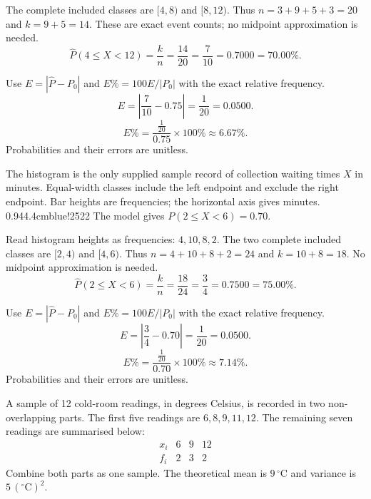 
The complete included classes are $[4,8)$ and $[8,12)$.
Thus $n=3+9+5+3=20$ and $k=9+5=14$. These are exact event counts; no midpoint approximation is needed.
\[\widehat P(4\le X<12)=\frac kn=\frac{14}{20}=\frac{7}{10}=0.7000=70.00\%.\]

Use $E=|\widehat P-P_0|$ and $E\%=100E/|P_0|$ with the exact relative frequency.
\[E=\left|\frac{7}{10}-0.75\right|=\frac{1}{20}=0.0500.\]
\[E\%=\frac{\frac{1}{20}}{0.75}\times100\%\approx6.67\%.\]
Probabilities and their errors are unitless.

The histogram is the only supplied sample record of collection waiting times $X$ in minutes. Equal-width classes include the left endpoint and exclude the right endpoint. Bar heights are frequencies; the horizontal axis gives minutes.
{0.94\linewidth}{4.4cm}{blue!25}{2}{2}
The model gives $P(2\le X<6)=0.70$.


Read histogram heights as frequencies: $4,10,8,2$.
The two complete included classes are $[2,4)$ and $[4,6)$.
Thus $n=4+10+8+2=24$ and $k=10+8=18$. No midpoint approximation is needed.
\[\widehat P(2\le X<6)=\frac kn=\frac{18}{24}=\frac{3}{4}=0.7500=75.00\%.\]

Use $E=|\widehat P-P_0|$ and $E\%=100E/|P_0|$ with the exact relative frequency.
\[E=\left|\frac{3}{4}-0.70\right|=\frac{1}{20}=0.0500.\]
\[E\%=\frac{\frac{1}{20}}{0.70}\times100\%\approx7.14\%.\]
Probabilities and their errors are unitless.

A sample of 12 cold-room readings, in degrees Celsius, is recorded in two non-overlapping parts. The first five readings are $6,8,9,11,12$. The remaining seven readings are summarised below:
\[
\begin{array}{c|rrr}x_i&6&9&12\\\hline f_i&2&3&2\end{array}
\]
Combine both parts as one sample. The theoretical mean is $9\,{}^\circ\mathrm C$ and variance is $5\,({}^\circ\mathrm C)^2$.

